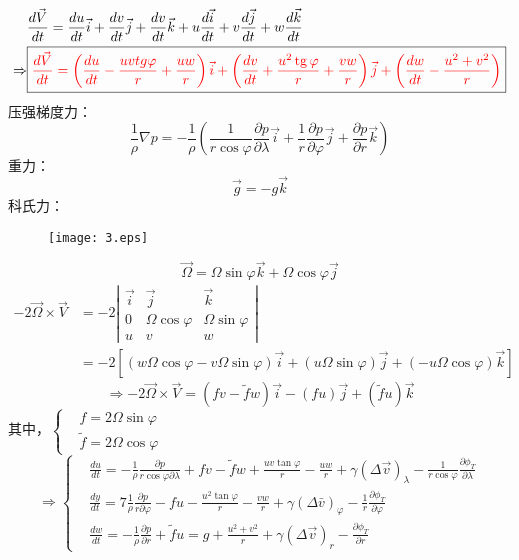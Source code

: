 \documentclass[a4paper,12pt]{article}
\begin{document}
    \newpage
    \[
        \begin{aligned}
            &\frac{d \vec{V}}{d t}=\frac{d u}{d t} \vec{i}+\frac{d v}{d t} \vec{j}+\frac{d v}{d t} \vec{k}+u \frac{d \vec{i}}{d t}+v \frac{d \vec{j}}{d t}+w \frac{d \vec{k}}{d t}\\
            \Rightarrow&\boxed{\color{red}\frac{d \vec{V}}{d t}=\left(\frac{d u}{d t}-\frac{u v t g \varphi}{r}+\frac{u w}{r}\right) \vec{i}+\left(\frac{d v}{d t}+\frac{u^{2} \operatorname{tg} \varphi}{r}+\frac{v w}{r}\right) \vec{j}+\left(\frac{d w}{d t}-\frac{u^{2}+v^{2}}{r}\right)}
        \end{aligned}
    \]
    压强梯度力：
    \[
        \frac{1}{\rho}\nabla p=-\frac{1}{\rho}\left(\frac{1}{r \cos \varphi} \frac{\partial p}{\partial \lambda} \vec{i}+\frac{1}{r} \frac{\partial p}{\partial \varphi} \vec{j}+\frac{\partial p}{\partial r} \vec{k}\right)
    \]
    重力：
    \[
        \vec{g}=-g\vec{k}
    \]
    科氏力：
    \begin{figure}[H]
        \centering \texttt{[image: 3.eps]}
        \caption*{}
    \end{figure}
    \vspace{-2cm}
    \[
        \vec{\Omega}=\Omega \sin \varphi \vec{k}+\Omega \cos \varphi \vec{j}
    \]
    \[
        \begin{aligned}
            -2 \vec{\Omega} \times \vec{V}&=-2\left|\begin{array}{ccc}\vec{i} & \vec{j} & \vec{k} \\ 0 & \Omega \cos \varphi & \Omega \sin \varphi \\ u & v & w\end{array}\right|\\
            &=-2[(w \Omega \cos \varphi-v \Omega \sin \varphi) \vec{i}+(u \Omega \sin \varphi) \vec{j}+(-u \Omega \cos \varphi) \vec{k}]
        \end{aligned}
    \]
    \[
        \Rightarrow-2 \vec{\Omega} \times \vec{V}=(f v-\tilde{f} w) \vec{i}-(f u) \vec{j}+(\tilde{f} u) \vec{k}
    \]
    其中，$\displaystyle\left\{\begin{aligned}&f=2\Omega \sin\varphi\\ &\tilde{f}=2\Omega \cos\varphi\end{aligned}\right.$
    \[
        \Rightarrow
        \boxed{
        \left\{
        \begin{aligned}
            &\frac{d u}{d t}=-\frac{1}{\rho} \frac{\partial p}{r \cos \varphi \partial \lambda}+f v-\tilde{f} w+\frac{u v \tan \varphi}{r}-\frac{u w}{r}+\gamma(\Delta \vec{v})_{\lambda}-\frac{1}{r \cos \varphi} \frac{\partial \phi_{T}}{\partial \lambda}\\
            &\frac{d y}{d t}=7 \frac{1}{\rho} \frac{\partial p}{r \partial \varphi}-f u-\frac{u^{2} \tan \varphi}{r}-\frac{v w}{r}+\gamma(\Delta \bar{v})_{\varphi}-\frac{1}{r} \frac{\partial \phi_{T}}{\partial \varphi}\\
            &\frac{d w}{d t}=-\frac{1}{\rho} \frac{\partial p}{\partial r}+\tilde{f} u=g+\frac{u^{2}+v^{2}}{r}+\gamma(\Delta \vec{v})_{r}-\frac{\partial \phi_{T}}{\partial r}
        \end{aligned}
        \right.
        }
    \]
\end{document}
